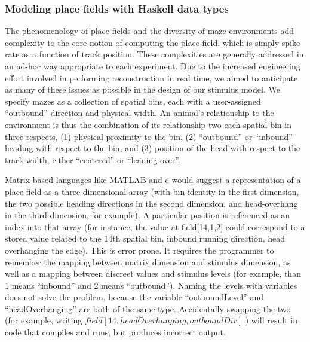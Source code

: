 \documentclass[]{article}
\begin{document}
\subsubsection{Modeling place fields with Haskell data types}

The phenomenology of place fields and the diversity of maze environments
add complexity to the core notion of computing the place field, which is
simply spike rate as a function of track position. These complexities
are generally addressed in an ad-hoc way appropriate to each experiment.
Due to the increased engineering effort involved in performing
reconstruction in real time, we aimed to anticipate as many of these
issues as possible in the design of our stimulus model. We specify mazes
as a collection of spatial bins, each with a user-assigned ``outbound''
direction and physical width. An animal's relationship to the
environment is thus the combination of its relationship two each spatial
bin in three respects, (1) physical proximity to the bin, (2)
``outbound'' or ``inbound'' heading with respect to the bin, and (3)
position of the head with respect to the track width, either
``centered'' or ``leaning over''.

Matrix-based languages like MATLAB and c would suggest a representation
of a place field as a three-dimensional array (with bin identity in the
first dimension, the two possible heading directions in the second
dimension, and head-overhang in the third dimension, for example). A
particular position is referenced as an index into that array (for
instance, the value at field{[}14,1,2{]} could correspond to a stored
value related to the 14th spatial bin, inbound running direction, head
overhanging the edge). This is error prone. It requires the programmer
to remember the mapping between matrix dimension and stimulus dimension,
as well as a mapping between discreet values and stimulus levels (for
example, than 1 means ``inbound'' and 2 means ``outbound''). Naming the
levels with variables does not solve the problem, because the variable
``outboundLevel'' and ``headOverhanging'' are both of the same type.
Accidentally swapping the two (for example, writing
\(field[14, headOverhanging, outboundDir]\) ) will result in code that
compiles and runs, but produces incorrect output.
\end{document}
